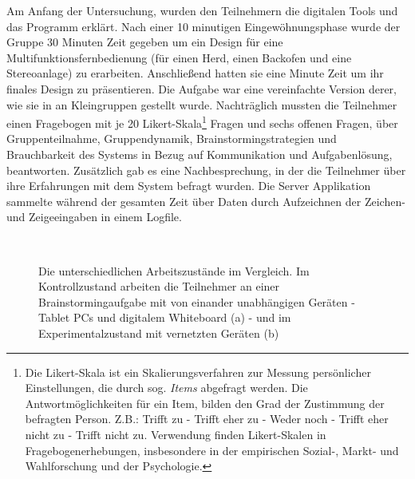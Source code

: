 \medskip Am Anfang der Untersuchung, wurden den Teilnehmern die digitalen Tools und das Programm erklärt. Nach einer 10 minutigen Eingewöhnungsphase wurde der Gruppe 30 Minuten Zeit gegeben um ein Design für eine Multifunktionsfernbedienung (für einen Herd, einen Backofen und eine Stereoanlage) zu erarbeiten. Anschließend hatten sie eine Minute Zeit um ihr finales Design zu präsentieren. Die Aufgabe war eine vereinfachte Version derer, wie sie in \citep{Tang1991143} an Kleingruppen gestellt wurde. Nachträglich mussten die Teilnehmer einen Fragebogen mit je 20 Likert-Skala\footnote{Die Likert-Skala ist ein Skalierungsverfahren zur Messung persönlicher Einstellungen, die durch sog. \emph{Items} abgefragt werden. Die Antwortmöglichkeiten für ein Item, bilden den Grad der Zustimmung der befragten Person. Z.B.: Trifft zu - Trifft eher zu - Weder noch - Trifft eher nicht zu - Trifft nicht zu. Verwendung finden Likert-Skalen in Fragebogenerhebungen, insbesondere in der empirischen Sozial-, Markt- und Wahlforschung und der Psychologie.} Fragen und sechs offenen Fragen, über Gruppenteilnahme, Gruppendynamik, Brainstormingstrategien und Brauchbarkeit des Systems in Bezug auf Kommunikation und Aufgabenlösung, beantworten. Zusätzlich gab es eine Nachbesprechung, in der die Teilnehmer über ihre Erfahrungen mit dem System befragt wurden. Die Server Applikation sammelte während der gesamten Zeit über Daten durch Aufzeichnen der Zeichen- und Zeigeeingaben in einem Logfile.

\begin{figure}
        \myfloatalign
         \quad
         \\
        \caption[Die unterschiedlichen Arbeitszustände im Vergleich.]{Die unterschiedlichen Arbeitszustände im Vergleich. Im Kontrollzustand arbeiten die Teilnehmer an einer Brainstormingaufgabe mit von einander unabhängigen Geräten - Tablet PCs und digitalem Whiteboard (a) - und im Experimentalzustand mit vernetzten Geräten (b)}\label{fig:basteaConditionExperimental}
\end{figure}

